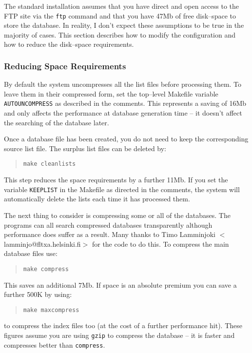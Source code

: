 The standard installation assumes that you have direct and open access to
the FTP site via the {\tt ftp} command and that you have 47Mb of free 
disk--space to store the database. In reality, I don't expect these 
assumptions to be true in the majority of cases. This section describes 
how to modify the configuration and how to reduce the disk--space 
requirements.

\subsubsection{Reducing Space Requirements}

By default the system uncompresses all the list files before processing 
them.
To leave them in their compressed form, set the top--level Makefile 
variable
{\tt AUTOUNCOMPRESS} as described in the comments. This represents a 
saving 
of 16Mb and only affects the performance at database generation time -- 
it doesn't affect the searching of the database later.

Once a database file has been created, you do not need to keep the 
corresponding source list file. The surplus list files can be deleted by:
\begin{quote}
{\tt make cleanlists}
\end{quote}

This step reduces the space requirements by a further 11Mb. If you set the
variable {\tt KEEPLIST} in the Makefile as directed in the comments, 
the system will automatically delete the lists each time it has processed 
them. 

The next thing to consider is compressing some or all of the databases. The
programs can all search compressed databases transparently although 
performance does suffer as a result. Many thanks to Timo Lamminjoki 
$<$lamminjo\-@fltxa.\-helsinki.\-fi$>$ for the code to do this. To 
compress 
the main database files use:
\begin{quote}
{\tt make compress}
\end{quote}

This saves an additional 7Mb. If space is an absolute premium you can save 
a
further 500K by using:
\begin{quote}
{\tt make maxcompress}
\end{quote}
to compress the index files too (at the cost of a further performance hit).
These figures assume you are using {\tt gzip} to compress the database -- 
it is
faster and compresses better than {\tt compress}. 

